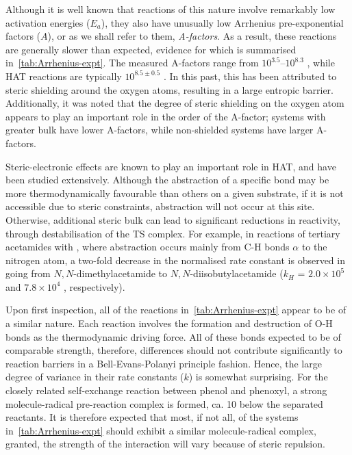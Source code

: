 Although it is well known that reactions of this nature involve remarkably low activation energies ($E_a$),\cite{Lucarini1996,Mahoney1970a,Mahoney1975,Korcek1972} they also have unusually low Arrhenius pre-exponential factors ($A$), or as we shall refer to them, \emph{A-factors}. As a result, these reactions are generally slower than expected, evidence for which is summarised in~\ref{tab:Arrhenius-expt}.
The measured A-factors range from $10^{3.5}$--$10^{8.3}$ \Ms, while HAT reactions are typically $10^{8.5\pm0.5}$ \Ms.\cite{Benson1976} In this past,  this has been attributed to steric shielding around the oxygen atoms, resulting in a large entropic barrier.\cite{DiLabio2005} Additionally, it was noted that the degree of steric shielding on the oxygen atom appears to play an important role in the order of the A-factor; systems with greater bulk have lower A-factors, while non-shielded systems have larger A-factors.

Steric-electronic effects are known to play an important role in HAT, and have been studied extensively.\cite{Finn2004,Salamone2011,Pischel2001,Griller1981,Bietti2011, Salamone2012,Malatesta1982,Salamone2014} Although the abstraction of a specific bond may be more thermodynamically favourable than others on a given substrate, if it is not accessible due to steric constraints, abstraction will not occur at this site. Otherwise, additional steric bulk can lead to significant reductions in reactivity, through destabilisation of the TS complex. For example, in reactions of tertiary acetamides with \cumo,\cite{Salamone2014} where abstraction occurs mainly from C-H bonds $\alpha$ to the nitrogen atom, a two-fold decrease in the normalised rate constant is observed in going from $N,N$-dimethylacetamide to $N,N$-diisobutylacetamide ($k_H$ = $2.0 \times 10^5$ and $7.8 \times 10^4$ \Ms, respectively).

Upon first inspection, all of the reactions in~\ref{tab:Arrhenius-expt} appear to be of a similar nature. Each reaction involves the formation and destruction of O-H bonds as the thermodynamic driving force. All of these bonds expected to be of comparable strength, therefore, differences should not contribute significantly to reaction barriers in a Bell-Evans-Polanyi principle fashion. Hence, the large degree of variance in their rate constants ($k$) is somewhat surprising. For the closely related self-exchange reaction between phenol and phenoxyl,\cite{Mayer2002} a strong molecule-radical pre-reaction complex is formed, ca. 10 \kcalmol below the separated reactants. It is therefore expected that most, if not all, of the systems in~\ref{tab:Arrhenius-expt} should exhibit a similar molecule-radical complex, granted, the strength of the interaction will vary because of steric repulsion.

